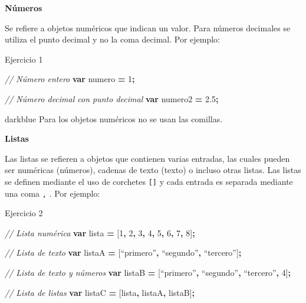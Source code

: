 \documentclass[
  12pt,
  letterpaper,
  twoside]{book}
\newenvironment{Shaded}{\begin{snugshade}}{\end{snugshade}}
\newcommand{\CommentTok}[1]{\textcolor[rgb]{0.56,0.35,0.01}{\textit{#1}}}
\newcommand{\DecValTok}[1]{\textcolor[rgb]{0.00,0.00,0.81}{#1}}
\newcommand{\FloatTok}[1]{\textcolor[rgb]{0.00,0.00,0.81}{#1}}
\newcommand{\KeywordTok}[1]{\textcolor[rgb]{0.13,0.29,0.53}{\textbf{#1}}}
\newcommand{\NormalTok}[1]{#1}
\newcommand{\OperatorTok}[1]{\textcolor[rgb]{0.81,0.36,0.00}{\textbf{#1}}}
\begin{document}
\textbf{Números}

Se refiere a objetos numéricos que indican un valor. Para números decimales se utiliza el punto decimal y no la coma decimal. Por ejemplo:

Ejercicio 1

\begin{Shaded}
\begin{Highlighting}[]
\CommentTok{// Número entero}
\KeywordTok{var}\NormalTok{ numero }\OperatorTok{=} \DecValTok{1}\OperatorTok{;} 
 
\CommentTok{// Número decimal con punto decimal  }
\KeywordTok{var}\NormalTok{ numero2 }\OperatorTok{=} \FloatTok{2.5}\OperatorTok{;}  
\end{Highlighting}
\end{Shaded}

\begin{bluebox2}

\begin{awesomeblock}{5pt}{\faLightbulb}{darkblue}
Para los objetos numéricos no se usan las comillas.

\end{awesomeblock}

\end{bluebox2}

\textbf{Listas}

Las listas se refieren a objetos que contienen varias entradas, las cuales pueden ser numéricas (números), cadenas de texto (texto) o incluso otras listas. Las listas se definen mediante el uso de corchetes \texttt{{[}{]}} y cada entrada es separada mediante una coma \texttt{,} . Por ejemplo:

Ejercicio 2

\begin{Shaded}
\begin{Highlighting}[]
\CommentTok{// Lista numérica}
\KeywordTok{var}\NormalTok{ lista }\OperatorTok{=}\NormalTok{ [}\DecValTok{1}\OperatorTok{,} \DecValTok{2}\OperatorTok{,} \DecValTok{3}\OperatorTok{,} \DecValTok{4}\OperatorTok{,} \DecValTok{5}\OperatorTok{,} \DecValTok{6}\OperatorTok{,} \DecValTok{7}\OperatorTok{,} \DecValTok{8}\NormalTok{]}\OperatorTok{;}   
  
\CommentTok{// Lista de texto            }
\KeywordTok{var}\NormalTok{ listaA }\OperatorTok{=}\NormalTok{ [“primero”}\OperatorTok{,}\NormalTok{ “segundo”}\OperatorTok{,}\NormalTok{ “tercero”]}\OperatorTok{;} 
   
\CommentTok{// Lista de texto y números  }
\KeywordTok{var}\NormalTok{ listaB }\OperatorTok{=}\NormalTok{ [“primero”}\OperatorTok{,}\NormalTok{ “segundo”}\OperatorTok{,}\NormalTok{ “tercero”}\OperatorTok{,} \DecValTok{4}\NormalTok{]}\OperatorTok{;} 

\CommentTok{// Lista de listas  }
\KeywordTok{var}\NormalTok{ listaC }\OperatorTok{=}\NormalTok{ [lista}\OperatorTok{,}\NormalTok{ listaA}\OperatorTok{,}\NormalTok{ listaB]}\OperatorTok{;} 
\end{Highlighting}
\end{Shaded}
\end{document}

